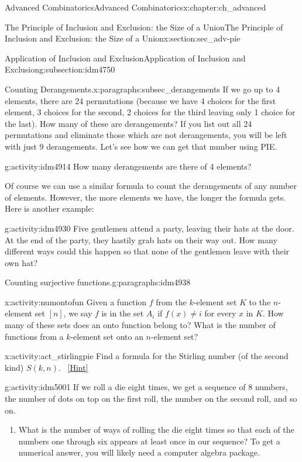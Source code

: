 \documentclass[oneside,10pt,]{book}
\numberwithin{equation}{chapter}
\begin{document}
\begin{chapterptx}{Advanced Combinatorics}{}{Advanced Combinatorics}{}{}{x:chapter:ch_advanced}
\begin{sectionptx}{The Principle of Inclusion and Exclusion: the Size of a Union}{}{The Principle of Inclusion and Exclusion: the Size of a Union}{}{}{x:section:sec_adv-pie}
\begin{subsectionptx}{Application of Inclusion and Exclusion}{}{Application of Inclusion and Exclusion}{}{}{g:subsection:idm4750}
\begin{paragraphs}{Counting Derangements.}{x:paragraphs:subsec_derangements}
If we go up to 4 elements, there are 24 permutations (because we have 4 choices for the first element, 3 choices for the second, 2 choices for the third leaving only 1 choice for the last). How many of these are derangements? If you list out all 24 permutations and eliminate those which are not derangements, you will be left with just 9 derangements. Let's see how we can get that number using PIE.%
\begin{activity}{}{g:activity:idm4914}%
How many derangements are there of 4 elements?%
\end{activity}
Of course we can use a similar formula to count the derangements of any number of elements. However, the more elements we have, the longer the formula gets. Here is another example:%
\begin{activity}{}{g:activity:idm4930}%
Five gentlemen attend a party, leaving their hats at the door. At the end of the party, they hastily grab hats on their way out. How many different ways could this happen so that none of the gentlemen leave with their own hat?%
\end{activity}
\end{paragraphs}%
\begin{paragraphs}{Counting surjective functions.}{g:paragraphs:idm4938}%
\begin{activity}{}{x:activity:numontofun}%
Given a function \(f\) from the \(k\)-element set \(K\) to the \(n\)-element set \([n]\), we say \(f\) is in the set \(A_i\) if \(f(x)\not= i\) for every \(x\) in \(K\). How many of these  sets does an onto function belong to? What is the number of functions from a \(k\)-element set onto an \(n\)-element set?%
\end{activity}
\begin{activity}{}{x:activity:act_stirlingpie}%
Find a formula for the Stirling number (of the second kind) \(S(k,n)\).%
\qquad~\hfill{\tiny\hyperlink{g:hint:idm4991-back}{[Hint]}}\end{activity}
\begin{activity}{}{g:activity:idm5001}%
If we roll a die eight times, we get a sequence of 8 numbers, the number of dots on top on the first roll, the number on the second roll, and so on.%
\begin{enumerate}[font=\bfseries,label=(\alph*),ref=\alph*]
\item{}What is the number of ways of rolling the die eight times so that each of the numbers one through six appears at least once in our sequence? To get a numerical answer, you will likely need a computer algebra package.%

\end{enumerate}
\end{activity}
\end{paragraphs}
\end{subsectionptx}
\end{sectionptx}
\end{chapterptx}
\end{document}
